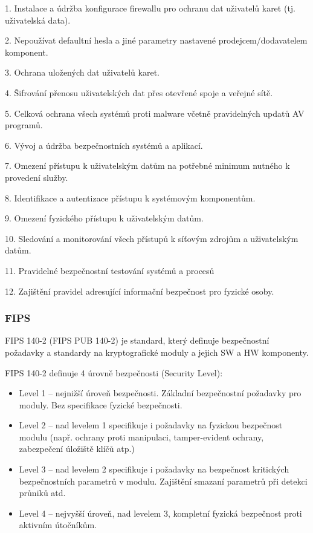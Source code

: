 1. Instalace a údržba konfigurace firewallu pro ochranu dat uživatelů karet (tj. uživatelská data).

2. Nepoužívat defaultní hesla a jiné parametry nastavené prodejcem/dodavatelem komponent.

3. Ochrana uložených dat uživatelů karet.

4. Šifrování přenosu uživatelských dat přes otevřené spoje a veřejné sítě.

5. Celková ochrana všech systémů proti malware včetně pravidelných updatů AV programů.

6. Vývoj a údržba bezpečnostních systémů a aplikací.

7. Omezení přístupu k uživatelským datům na potřebné minimum nutného k provedení služby.

8. Identifikace a autentizace přístupu k systémovým komponentům.

9. Omezení fyzického přístupu k uživatelským datům.

10. Sledování a monitorování všech přístupů k síťovým zdrojům a uživatelským datům.

11. Pravidelné bezpečnostní testování systémů a procesů

12. Zajištění pravidel adresující informační bezpečnost pro fyzické osoby. 

\subsubsection{FIPS}
FIPS 140-2 (FIPS PUB 140-2) je standard, který definuje bezpečnostní požadavky a standardy na kryptografické moduly a jejich SW a HW komponenty.

FIPS 140-2 definuje 4 úrovně bezpečnosti (Security Level):
\begin{itemize}
    \item Level 1 – nejnižší úroveň bezpečnosti. Základní bezpečnostní požadavky pro moduly. Bez specifikace fyzické bezpečnosti.
    \item Level 2 – nad levelem 1 specifikuje i požadavky na fyzickou bezpečnost modulu (např. ochrany proti manipulaci, tamper-evident ochrany, zabezpečení úložiště klíčů atp.)
    \item Level 3 – nad levelem 2 specifikuje i požadavky na bezpečnost kritických bezpečnostních parametrů v modulu. Zajištění smazaní parametrů při detekci průniků atd.
    \item Level 4 – nejvyšší úroveň, nad levelem 3, kompletní fyzická bezpečnost proti aktivním útočníkům.
\end{itemize}

